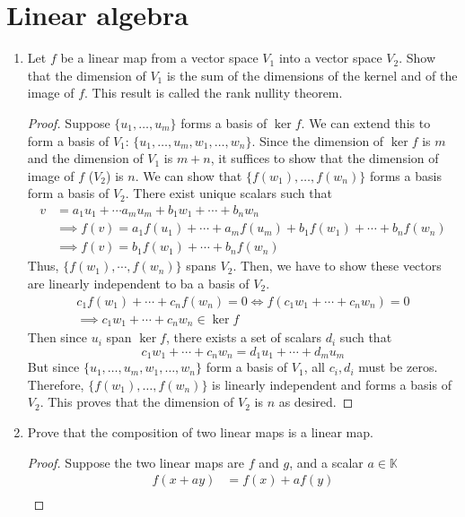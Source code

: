 \section{Linear algebra}
\begin{enumerate}
	\item Let $f$ be a linear map from a vector space $V_1$ into a vector space $V_2$.
    Show that the dimension of $V_1$ is the sum of the dimensions of the kernel and of the image of $f$.
	This result is called the rank nullity theorem.
	\begin{proof}
	Suppose \(\{{u}_{1},\ldots ,{u}_{m}\}\) forms a basis of \(\ker f\).
	We can extend this to form a basis of $V_1$: \(\{{u}_{1},\ldots ,{u}_{m},{w}_{1},\ldots,{w}_{n}\}\).
	Since the dimension of $\ker f$ is $m$ and the dimension of $V_1$ is \(m + n\), it suffices to show that the dimension of image of $f$ ($V_2$) is $n$.
	We can show that \(\{f({w}_{1}),\ldots,f({w}_{n})\}\) forms a basis form a basis of $V_2$.
	There exist unique scalars such that
	\begin{align*}
		v&=a_1u_1+\cdots a_m u_m+b_1 w_1+\cdots+ b_n w_n\\
		&\implies f(v)=a_1 f(u_1)+\cdots+ a_m f(u_m)+b_1 f(w_1)+\cdots+ b_n f(w_n)\\
		&\implies f(v)=b_1 f(w_1)+\cdots+ b_n f(w_n)
	\end{align*}
	Thus, \(\{f(w_1),\cdots, f(w_n)\} \) spans $V_2$.
	Then, we have to show these vectors are linearly independent to ba a basis of $V_2$.
	\begin{align*}
		c_1 f(w_1)+\cdots+c_n f(w_n)=0 \iff f(c_1w_1+\cdots+c_n w_n)=0\\
		\implies c_1w_1+\cdots+c_n w_n\in \ker f
	\end{align*}
	Then since $u_i$ span $\ker f$, there exists a set of scalars $d_i$ such that
	\[ c_1w_1+\cdots+c_n w_n=d_1u_1+\cdots+d_m u_m \]
	But since \(\{{u}_{1},\ldots ,{u}_{m},{w}_{1},\ldots,{w}_{n}\}\) form a basis of $V_1$, all $c_i,d_i$ must be zeros.
	Therefore, \(\{f({w}_{1}),\ldots,f({w}_{n})\}\) is linearly independent and forms a basis of $V_2$.
	This proves that the dimension of $V_2$ is $n$ as desired.
	\end{proof}
    \item Prove that the composition of two linear maps is a linear map.
	\begin{proof}
	Suppose the two linear maps are $f$ and $g$, and a scalar \(a\in\mathbb{K}\)
	\begin{align*}
		f(x+ay)&=f(x)+a f(y)\\

\end{align*}
\end{proof}
\end{enumerate}
